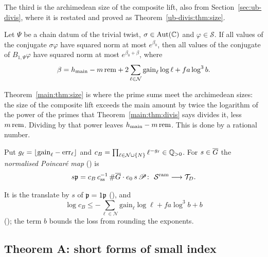 The third is the archimedean size of the composite lift, also from Section~\ref{sec:ub-divis},
where it is restated and proved as Theorem~\ref{ub-divis:thm:size}.

\begin{theorem}
\label{main:thm:size}
Let $\Psi$ be a chain datum of the trivial twist, $\sigma \in \operatorname{Aut}(\mathbb{C})$ and
$\varphi \in \mathcal{S}$. If all values of the conjugate $\sigma\varphi$ have squared norm at most
$e^{\beta_0}$, then all values of the conjugate of $B_{1,\Psi}\varphi$ have squared norm at most
$e^{\beta_0+\beta}$, where
\[
  \beta = h_{\mathrm{main}} - m\,\mathrm{rem} + 2\sum_{\ell\in\mathcal{N}} \mathrm{gain}_\ell\log\ell + f a\log^3 b .
\]
\end{theorem}

Theorem~\ref{main:thm:size} is where the prime sums meet the archimedean sizes: the size of the
composite lift exceeds the main amount by twice the logarithm of the power of the primes that
Theorem~\ref{main:thm:divis} says divides it, less $m\,\mathrm{rem}$. Dividing by that power leaves
$h_{\mathrm{main}} - m\,\mathrm{rem}$. This is done by a rational number.

\begin{definition}
\label{main:def:npoincare}
Put $g_\ell = \lfloor\mathrm{gain}_\ell - \mathrm{err}_\ell\rfloor$ and
$c_B = \prod_{\ell \in \mathcal{N}\cup\{N\}} \ell^{-g_\ell} \in \mathbb{Q}_{>0}$. For $s \in \overline{G}$ the
\emph{normalised Poincar\'e map} () is
\[
  s\mathfrak{p} = c_B\, c_{\mathrm{ss}}^{-1}\, \#\overline{G} \cdot e_0\, s\, \mathscr{P}
  \colon\ \mathcal{S}^{\mathrm{ram}} \longrightarrow \mathcal{T}_D .
\]
\end{definition}

It is the translate by $s$ of $\mathfrak{p} = 1\mathfrak{p}$ (), and
\begin{equation}\label{main:eq:cB}
  \log c_B \le -\sum_{\ell\in\mathcal{N}} \mathrm{gain}_\ell\log\ell + f a\log^3 b + b
\end{equation}
(); the term $b$ bounds the loss from rounding the exponents.

\subsection{Theorem A: short forms of small index}

